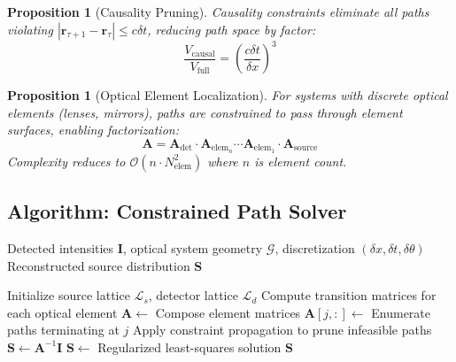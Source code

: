 \documentclass[twocolumn,10pt,a4paper]{article}
\newtheorem{proposition}[theorem]{Proposition}
\begin{document}
\begin{proposition}[Causality Pruning]
Causality constraints eliminate all paths violating $|\mathbf{r}_{\tau+1} - \mathbf{r}_\tau| \leq c\delta t$, reducing path space by factor:
\begin{equation}
\frac{V_{\text{causal}}}{V_{\text{full}}} = \left(\frac{c\delta t}{\delta x}\right)^3
\end{equation}
\end{proposition}

\begin{proposition}[Optical Element Localization]
For systems with discrete optical elements (lenses, mirrors), paths are constrained to pass through element surfaces, enabling factorization:
\begin{equation}
\mathbf{A} = \mathbf{A}_{\text{det}} \cdot \mathbf{A}_{\text{elem}_n} \cdots \mathbf{A}_{\text{elem}_1} \cdot \mathbf{A}_{\text{source}}
\end{equation}
Complexity reduces to $\mathcal{O}(n \cdot N_{\text{elem}}^2)$ where $n$ is element count.
\end{proposition}

\subsection{Algorithm: Constrained Path Solver}

\begin{algorithm}[H]
\caption{RPI Reconstruction via Constrained Path Satisfaction}
\begin{algorithmic}[1]
\Require Detected intensities $\mathbf{I}$, optical system geometry $\mathcal{G}$, discretization $(\delta x, \delta t, \delta\theta)$
\Ensure Reconstructed source distribution $\mathbf{S}$

\State Initialize source lattice $\mathcal{L}_s$, detector lattice $\mathcal{L}_d$
\State Compute transition matrices for each optical element
\State $\mathbf{A} \gets$ Compose element matrices
    \State $\mathbf{A}[j,:] \gets$ Enumerate paths terminating at $j$
    \State Apply constraint propagation to prune infeasible paths
\EndFor
{}
    \State $\mathbf{S} \gets \mathbf{A}^{-1} \mathbf{I}$ 
\Else
    \State $\mathbf{S} \gets$ Regularized least-squares solution
\EndIf
\State \Return $\mathbf{S}$
\end{algorithmic}
\end{algorithm}
\end{document}
